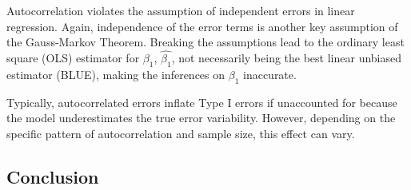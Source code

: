 \documentclass[
]{article}
\begin{document}
Autocorrelation violates the assumption of independent errors in linear
regression. Again, independence of the error terms is another key
assumption of the Gauss-Markov Theorem. Breaking the assumptions lead to
the ordinary least square (OLS) estimator for \(\beta_1\),
\(\hat{\beta_1}\), not necessarily being the best linear unbiased
estimator (BLUE), making the inferences on \(\beta_1\) inaccurate.

Typically, autocorrelated errors inflate Type I errors if unaccounted
for because the model underestimates the true error variability.
However, depending on the specific pattern of autocorrelation and sample
size, this effect can vary.

\hypertarget{conclusion-1}{%
\subsection{Conclusion}\label{conclusion-1}}
\end{document}
